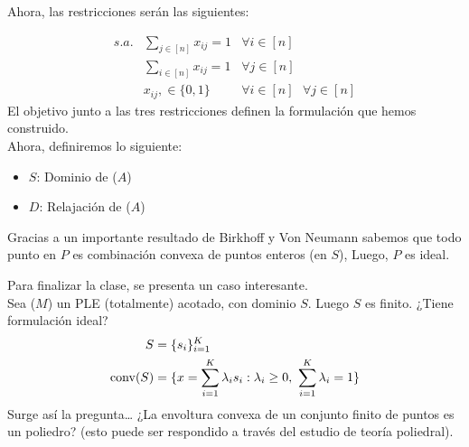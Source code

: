 \begin{eje}
Ahora, las restricciones serán las siguientes:

\begin{equation*}
    \begin{array}{rll}
        s.a.&\sum\limits_{j\in[n]}x_{ij}=1&\forall i \in [n]\\
        &\sum\limits_{i\in [n]}x_{ij}=1&\forall j \in [n]\\
        &x_{ij},\in\{0,1\}&\forall i\in[n]\text{ }\forall j\in[n]
    \end{array}
\end{equation*}
El objetivo junto a las tres restricciones definen la formulación que hemos construido. \\

Ahora, definiremos lo siguiente:
\begin{itemize}
    \item $S$: Dominio de ($A$)
    \item $D$: Relajación de ($A$)
\end{itemize}


Gracias a un importante resultado de Birkhoff y Von Neumann sabemos que todo punto en $P$ es combinación convexa de puntos enteros (en $S$), Luego, $P$ es ideal.
\end{eje}

Para finalizar la clase, se presenta un caso interesante. \\
Sea ($M$) un PLE (totalmente) acotado, con dominio $S$. Luego $S$ es finito. ¿Tiene formulación ideal?
\begin{align*}
    S &=\{s_i\}_{i=1}^K\\
    \conv(S) &=\{x=\sum_{i=1}^K \lambda_i s_i:\lambda_i\geq 0,\ \sum_{i=1}^K \lambda_i=1\}
\end{align*}
Surge así la pregunta\ldots
¿La envoltura convexa de un conjunto finito de puntos es un poliedro? (esto puede ser respondido a través del estudio de teoría poliedral).


